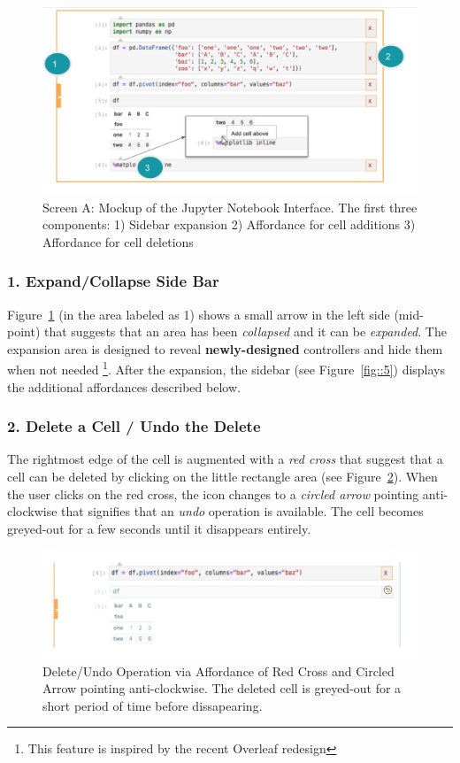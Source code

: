 \documentclass[12pt,letterpaper]{article}
\begin{document}
\begin{figure}[hbt!]
\centering
\includegraphics[scale=.6]{figures/project-principles/jupyter_mock_screen_a.png}
\caption{Screen A: Mockup of the Jupyter Notebook Interface. The first three components: 1) Sidebar expansion 2) Affordance for cell additions 3) Affordance for cell deletions}
\label{fig::4}
\end{figure}

\subsubsection*{1. Expand/Collapse Side Bar}
Figure~\ref{fig::4} (in the area labeled as 1) shows a small arrow in the left side (mid-point) that suggests that an area has been \textit{collapsed} and it can be \textit{expanded}. The expansion area is designed to reveal \textbf{newly-designed} controllers and hide them when not needed \footnote{This feature is inspired by the recent Overleaf redesign}. After the expansion, the sidebar (see Figure~\ref{fig::5}) displays the additional affordances described below.

\subsubsection*{2. Delete a Cell / Undo the Delete}
The rightmost edge of the cell is augmented with a \textit{red cross}  that suggest that a cell can be deleted by clicking on the little rectangle area (see Figure~\ref{fig::undo}). When the user clicks on the red cross, the icon changes to a \textit{circled arrow} pointing anti-clockwise that signifies that an \textit{undo} operation is available. The cell becomes greyed-out for a few seconds until it disappears entirely.

\begin{figure}[hbt!]
\centering
\includegraphics[scale=.5]{figures/project-principles/delete_undo.png}
\caption{Delete/Undo Operation via Affordance of Red Cross and Circled Arrow pointing anti-clockwise. The deleted cell is greyed-out for a short period of time before dissapearing.}
\label{fig::undo}
\end{figure}
\end{document}
